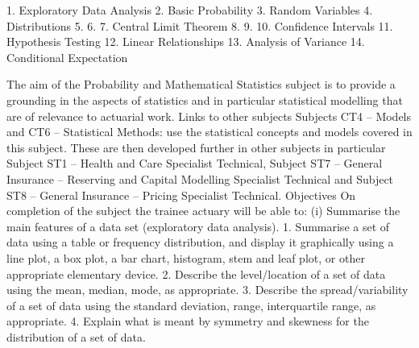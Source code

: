 1. Exploratory Data Analysis
2. Basic Probability
3. Random Variables
4. Distributions
5.
6.
7. Central Limit Theorem
8.
9.
10. Confidence Intervals
11. Hypothesis Testing
12. Linear Relationships
13. Analysis of Variance
14. Conditional Expectation

The aim of the Probability and Mathematical Statistics subject is to provide a grounding in the aspects of statistics and in particular statistical modelling that are of relevance to actuarial work.  
Links to other subjects  
Subjects CT4 – Models and CT6 – Statistical Methods: use the statistical concepts and models covered in this subject.  These are then developed further in other subjects in particular Subject ST1 – Health and Care Specialist Technical, Subject ST7 – General Insurance – Reserving and Capital Modelling Specialist Technical and Subject ST8 – General Insurance – Pricing Specialist Technical.  
Objectives  
On completion of the subject the trainee actuary will be able to:  
(i) Summarise the main features of a data set (exploratory data analysis).  
 1. Summarise a set of data using a table or frequency distribution, and display it graphically using a line plot, a box plot, a bar chart, histogram, stem and leaf plot, or other appropriate elementary device.  
 2. Describe the level/location of a set of data using the mean, median, mode, as appropriate.  
 3. Describe the spread/variability of a set of data using the standard deviation, range, interquartile range, as appropriate.  
 4. Explain what is meant by symmetry and skewness for the distribution of a set of data.  


